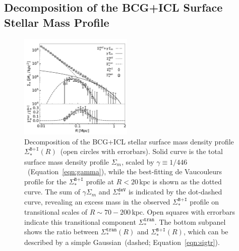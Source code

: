 \documentclass[fleqn,usenatbib]{mnras}
\newcommand{\sigbi}{\Sigma_*^{\texttt{B+I}}}
\newcommand{\sigm}{\Sigma_m}
\newcommand{\sigdev}{\Sigma_*^{\texttt{deV}}}
\newcommand{\sigtr}{\Sigma_*^{\texttt{tran}}}
\newcommand{\kpc}{\mathrm{kpc}}
\begin{document}
\subsection{Decomposition of the BCG+ICL Surface Stellar Mass Profile}
\label{subsec:decomposition}


\begin{figure}
    \includegraphics[width=0.48\textwidth]{fig/DM_Ng_compare.pdf}
    \caption{Decomposition of the BCG+ICL stellar surface mass density
    profile $\sigbi(R)$~(open circles with errorbars). Solid curve is the
    total surface mass density profile $\sigm$, scaled by
    $\gamma{\equiv}1/446$~(Equation~\ref{eqn:gamma}), while the
    best-fitting de Vaucouleurs profile for the $\sigbi$ profile at
    $R{<}20\,\kpc$ is shown as the dotted curve.  The sum of $\gamma\sigm$
    and $\sigdev$ is indicated by the dot-dashed curve, revealing an excess
    mass in the observed $\sigbi$ profile on transitional scales of
    $R{\sim}70{-}200\,\kpc$. Open squares with errorbars indicate this
    transitional component $\sigtr$. The bottom subpanel shows the ratio
    between $\sigtr(R)$ and $\sigbi(R)$, which can be described by a
    simple Gaussian~(dashed; Equation~\ref{eqn:sigtr}).\label{fig:decomposition} }
\end{figure}
\end{document}
